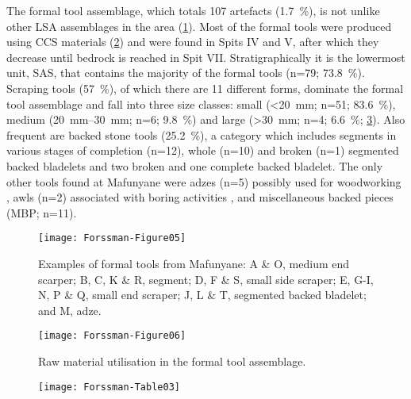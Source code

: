  The formal tool assemblage, which totals 107  artefacts (\SI{1.7}{\percent}), 
is not unlike other LSA assemblages in the area \parencite{vanDoornum_2005}(\cref{fig:Forssman-Figure05}). 
Most of the formal tools were produced using CCS materials (\cref{fig:Forssman-Figure06})
  and were found in Spits IV and V, after which they decrease until bedrock is reached in Spit VII. Stratigraphically it is the lowermost unit, SAS, that contains the majority of the formal tools (n=79; \SI{73.8}{\percent}). 
  Scraping tools (\SI{57}{\percent}), of which there are 11 different forms,
   dominate the formal tool assemblage and fall into three size classes: 
   small (<\SI{20}{\milli\meter}; n=51; \SI{83.6}{\percent}), 
   medium (\SIrange{20}{30}{\milli\meter}; n=6; \SI{9.8}{\percent}) and large (>\SI{30}{\milli\meter}; n=4; \SI{6.6}{\percent}; 
   \cref{fig:Forssman-Table03}). 
 Also frequent are backed stone tools (\SI{25.2}{\percent}), a category which includes segments in various stages of completion (n=12), 
whole (n=10) and broken (n=1) segmented backed bladelets and two broken and one complete backed bladelet. 
The only other tools found at Mafunyane were adzes (n=5) possibly used for woodworking \parencite{Walker_1994}, awls (n=2) associated with boring activities \parencite{Deacon_1984a}, and miscellaneous backed pieces (MBP; n=11). 
   
	\begin{figure} %
		\texttt{[image: Forssman-Figure05]}
		\caption{Examples of formal tools from Mafunyane: A \& O, medium end scarper; B, C, K \& R, segment; D, F \& S, small side scraper; E, G-I, N, P \& Q, small end scraper; J, L \& T, segmented backed bladelet; and M, adze.}
		\label{fig:Forssman-Figure05}
	\end{figure}
	
		\begin{figure} %
			\texttt{[image: Forssman-Figure06]}
			\caption{Raw material utilisation in the formal tool assemblage.}
			\label{fig:Forssman-Figure06}
		\end{figure}
	
	\begin{figure} %
		\texttt{[image: Forssman-Table03]}
		\label{fig:Forssman-Table03}
	\end{figure}
   
